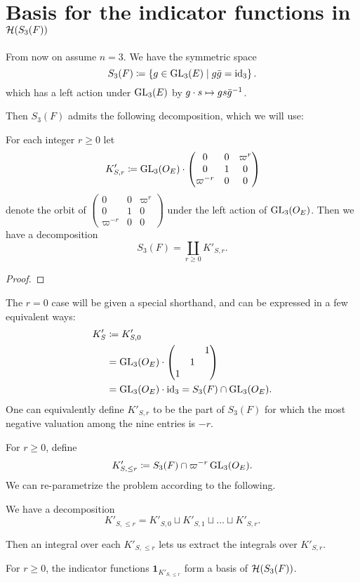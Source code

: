 \section{Basis for the indicator functions in $\mathcal H(S_3(F))$}
\label{ch:orbital0_hecke_basis}
From now on assume $n = 3$.
We have the symmetric space
\[ S_3(F) \coloneqq \left\{ g \in \operatorname{GL}_3(E) \mid g \bar{g} = \operatorname{id}_3 \right\}. \]
which has a left action under $\operatorname{GL}_3(E)$ by $g \cdot s \mapsto gs\bar{g}^{-1}$.

Then $S_3(F)$ admits the following decomposition, which we will use:
\begin{lemma}
  For each integer $r \ge 0$ let
  \[ K'_{S,r} \coloneqq \operatorname{GL}_3(O_E) \cdot \begin{pmatrix} 0 & 0 & \varpi^r \\ 0 & 1 & 0 \\ \varpi^{-r} & 0 & 0 \end{pmatrix} \]
  denote the orbit of
  $\begin{pmatrix} 0 & 0 & \varpi^r \\ 0 & 1 & 0 \\ \varpi^{-r} & 0 & 0 \end{pmatrix}$
  under the left action of $\operatorname{GL}_3(O_E)$.
  Then we have a decomposition
  \[ S_3(F) = \coprod_{r \geq 0} K'_{S,r}. \]
\end{lemma}
\begin{proof}
\end{proof}

The $r=0$ case will be given a special shorthand,
and can be expressed in a few equivalent ways:
\begin{align*}
  K'_S
  &\coloneqq K'_{S,0} \\
  &= \operatorname{GL}_3(O_E) \cdot \begin{pmatrix} & & 1 \\ & 1 \\ 1 \end{pmatrix} \\
  &= \operatorname{GL}_3(O_E) \cdot \operatorname{id}_3 = S_3(F) \cap \operatorname{GL}_3(O_E).
\end{align*}
One can equivalently define $K'_{S,r}$ to be the part of $S_3(F)$
for which the most negative valuation among the nine entries is $-r$.

For $r \geq 0$, define
\[ K'_{S, \le r} \coloneqq S_3(F) \cap \varpi^{-r} \operatorname{GL}_3(O_E). \]
We can re-parametrize the problem according to the following.
\begin{corollary}
  We have a decomposition
  \[ K'_{S, \le r} = K'_{S,0} \sqcup K'_{S,1} \sqcup \dots \sqcup K'_{S,r}. \]
\end{corollary}
Then an integral over each $K'_{S, \le r}$ lets us extract the integrals over $K'_{S,r}$.
\begin{corollary}
  For $r \ge 0$, the indicator functions $\mathbf{1}_{K'_{S, \le r}}$
  form a basis of $\mathcal H(S_3(F))$.
\end{corollary}

